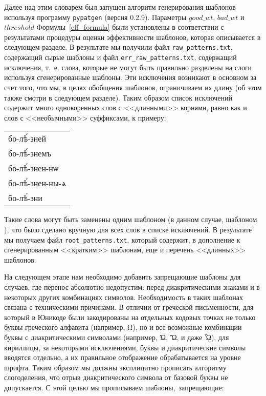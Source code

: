 \documentclass[12pt,a4paper,oneside]{extarticle}
\begin{document}
Далее над этим словарем был запущен алгоритм генерирования шаблонов используя программу \verb+pypatgen+ (версия 0.2.9). Параметры $good\_wt$, $bad\_wt$ и $threshold$ Формулы~\ref{eff_formula} были установлены в соответствии с результатами процедуры оценки эффективности шаблонов, которая описывается в следующем разделе. В результате мы получили файл \verb+raw_patterns.txt+, содержащий сырые шаблоны и файл \verb+err_raw_patterns.txt+, содержащий исключения, т.~е. слова, которые не могут быть правильно разделены на слоги используя сгенерированные шаблоны. Эти исключения возникают в основном за счет того, что мы, в целях обобщения шаблонов, ограничиваем их длину (об этом также смотри в следующем разделе). Таким образом список исключений содержит много однокоренных слов с <<длинными>> корнями, равно как и слов с <<необычными>> суффиксами, к примеру:

\begin{center}
\begin{churchslavonic}
\begin{tabular}{l}
бо-лѣ́-зней \\
бо-лѣ́-знемъ \\
бо-лѣ́-знен-нѡ \\
бо-лѣ́-знен-ны-ѧ \\
бо-лѣ́-зни \\
\end{tabular}
\end{churchslavonic}
\end{center}

Такие слова могут быть заменены одним шаблоном (в данном случае, шаблоном ), что было сделано вручную для всех слов в списке исключений. В результате мы получаем файл \verb+root_patterns.txt+, который содержит, в дополнение к сгенерированным <<кратким>> шаблонам, еще и перечень <<длинных>> шаблонов.

На следующем этапе нам необходимо добавить запрещающие шаблоны для случаев, где перенос абсолютно недопустим: перед диакритическими знаками и в некоторых других комбинациях символов. Необходимость в таких шаблонах связана с техническими причинами. В отличии от греческой письменности, для который в Юникоде были закодированы на отдельных кодовых точках не только буквы греческого алфавита (например, \textgreek{Ω}), но и все возможные комбинации буквы с диакритическими символами (например, \textgreek{Ὠ}, \textgreek{Ὥ}, и даже \textgreek{ᾯ}), для кириллицы, за некоторыми исключениями, буквы и диакритические символы вводятся отдельно, а их правильное отображение обрабатывается на уровне шрифта. Таким образом мы должны эксплицитно прописать алгоритму слогоделения, что отрыв диакритического символа от базовой буквы не допускается. С этой целью мы прописываем шаблоны, запрещающие:
\end{document}
